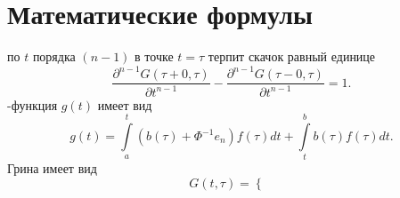 \documentclass[11pt]{article}
\begin{document}
\center\section*{Математические формулы}
\begin{enumerate}
 по $t$ порядка $(n-1)$ в точке $t=\tau$ терпит скачок равный единице
\[
	\frac{\partial^{n-1}G(\tau+0,\tau)}{\partial t^{n-1}}-\frac{\partial^{n-1}G(\tau-0,\tau)}{\partial t^{n-1}}=1.
\]
-функция $g(t)$ имеет вид
\[
	g(t)=\int\limits_a^t (b(\tau)+\Phi^{-1}e_n)f(\tau)dt+\int\limits_t^b b(\tau)f(\tau)dt.
\]
 Грина имеет вид
\[
	G(t,\tau)=
			\begin{cases}
				
			\end{cases}
\]
\end{enumerate}
\end{document}
